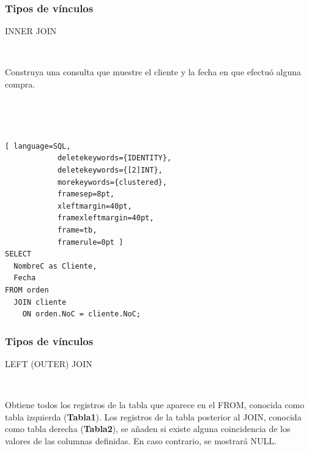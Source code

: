 \documentclass[
	10pt, %
	aspectratio=169, %
]{beamer}
\begin{document}
\begin{frame}[fragile]
	
	\frametitle{Tipos de vínculos}
	
	\begin{center}
		\textcolor{codepurple}{INNER JOIN}
	\end{center}
	
	\ 
		
	Construya una consulta que muestre el cliente y la fecha en que efectuó alguna compra.
		
		\pause 
		
		\ 
		
		\ 
		
		\begin{lstlisting}[ language=SQL,
			deletekeywords={IDENTITY},
			deletekeywords={[2]INT},
			morekeywords={clustered},
			framesep=8pt,
			xleftmargin=40pt,
			framexleftmargin=40pt,
			frame=tb,
			framerule=0pt ]
SELECT 
  NombreC as Cliente, 
  Fecha
FROM orden 
  JOIN cliente
    ON orden.NoC = cliente.NoC;
\end{lstlisting}
				
\end{frame}


\begin{frame}[fragile]
	
	\frametitle{Tipos de vínculos}
	
	\begin{center}
	
		\textcolor{codepurple}{LEFT (OUTER) JOIN}
		
		\ 
		
		Obtiene todos los registros de la tabla que aparece en el \textcolor{codepurple}{FROM}, conocida como tabla izquierda (\textbf{Tabla1}). Los registros de la tabla posterior al \textcolor{codepurple}{JOIN}, conocida como tabla derecha (\textbf{Tabla2}), se añaden si existe alguna coincidencia de los valores de las columnas definidas. En caso contrario, se mostrará \textcolor{codepurple}{NULL}.
		
		\begin{venndiagram2sets}[
			labelA={ }, labelOnlyA={Tabla1}, 
			labelB={ }, labelOnlyB={Tabla2}, 
			showframe=false]
			\fillA
		\end{venndiagram2sets}
		
	\end{center}

\end{frame}
	
\end{document}
